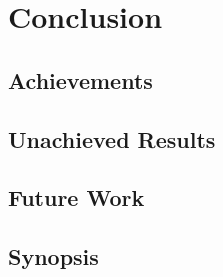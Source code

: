 
\chapter{Conclusion} %

\label{chap:Chapter9} %


\section{Achievements}

\section{Unachieved Results}

\section{Future Work}

\section{Synopsis}